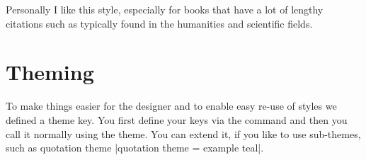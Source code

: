 \bottomline

Personally I like this style, especially for books that have a lot
of lengthy citations such as typically found in the humanities and
scientific fields.

\section{Theming}

To make things easier for the designer and to enable easy re-use of
styles we defined a theme key. You first define your keys via
the  command and then you call it normally using the 
theme. You can extend it, if you like to use sub-themes, such as 
quotation theme |quotation theme = example teal|. 

\begin{teX}
\end{teX}








